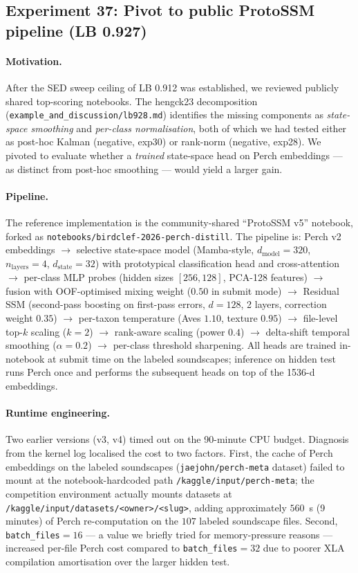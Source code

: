 \subsection{Experiment 37: Pivot to public ProtoSSM pipeline (LB 0.927)}
\label{sec:exp37_protossm}

\paragraph{Motivation.}
After the SED sweep ceiling of LB 0.912 was established, we reviewed
publicly shared top-scoring notebooks. The hengck23 decomposition
(\texttt{example\_and\_discussion/lb928.md}) identifies the missing
components as \emph{state-space smoothing} and \emph{per-class
normalisation}, both of which we had tested either as post-hoc Kalman
(negative, exp30) or rank-norm (negative, exp28). We pivoted to
evaluate whether a \emph{trained} state-space head on Perch embeddings
--- as distinct from post-hoc smoothing --- would yield a larger gain.

\paragraph{Pipeline.}
The reference implementation is the community-shared ``ProtoSSM v5''
notebook, forked as
\texttt{notebooks/birdclef-2026-perch-distill}. The pipeline is:
Perch v2 embeddings $\to$ selective state-space model (Mamba-style,
$d_\mathrm{model}{=}320$, $n_\mathrm{layers}{=}4$,
$d_\mathrm{state}{=}32$) with prototypical classification head and
cross-attention $\to$ per-class MLP probes
(hidden sizes $[256,128]$, PCA-128 features) $\to$ fusion with
OOF-optimised mixing weight ($0.50$ in submit mode) $\to$ Residual
SSM (second-pass boosting on first-pass errors, $d{=}128$, 2 layers,
correction weight $0.35$) $\to$ per-taxon temperature (Aves $1.10$,
texture $0.95$) $\to$ file-level top-$k$ scaling ($k{=}2$) $\to$
rank-aware scaling (power $0.4$) $\to$ delta-shift temporal smoothing
($\alpha{=}0.2$) $\to$ per-class threshold sharpening. All heads are
trained in-notebook at submit time on the labeled soundscapes;
inference on hidden test runs Perch once and performs the subsequent
heads on top of the 1536-d embeddings.

\paragraph{Runtime engineering.}
Two earlier versions (v3, v4) timed out on the 90-minute CPU budget.
Diagnosis from the kernel log localised the cost to two factors.
First, the cache of Perch embeddings on the labeled soundscapes
(\texttt{jaejohn/perch-meta} dataset) failed to mount at the
notebook-hardcoded path \texttt{/kaggle/input/perch-meta}; the
competition environment actually mounts datasets at
\texttt{/kaggle/input/datasets/<owner>/<slug>}, adding approximately
$560$~s (9 minutes) of Perch re-computation on the $107$ labeled
soundscape files. Second, \texttt{batch\_files$=16$} --- a value we
briefly tried for memory-pressure reasons --- increased per-file
Perch cost compared to \texttt{batch\_files$=32$} due to poorer
XLA compilation amortisation over the larger hidden test.

